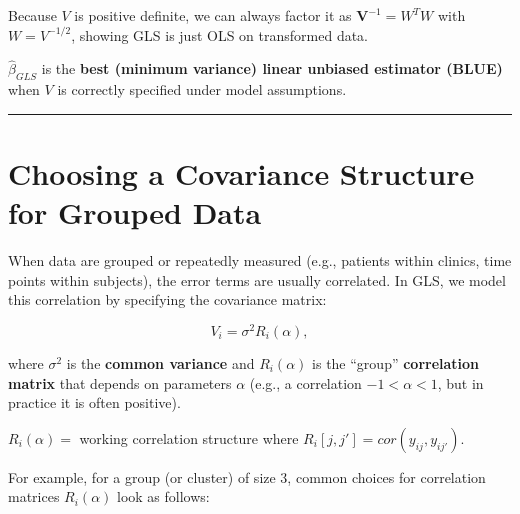 \documentclass[
  letterpaper,
  DIV=11,
  numbers=noendperiod]{scrreprt}
\begin{document}
Because \(V\) is positive definite, we can always factor it as
\(\mathbf{V}^{-1} = W^T W\) with \(W = V^{-1/2}\), showing GLS is just
OLS on transformed data.

\(\hat{\beta}_{GLS}\) is the \textbf{best (minimum variance) linear
unbiased estimator (BLUE)} when \(V\) is correctly specified under model
assumptions.

\begin{center}\rule{0.5\linewidth}{0.5pt}\end{center}

\hypertarget{choosing-a-covariance-structure-for-grouped-data}{%
\section*{Choosing a Covariance Structure for Grouped
Data}\label{choosing-a-covariance-structure-for-grouped-data}}


When data are grouped or repeatedly measured (e.g., patients within
clinics, time points within subjects), the error terms are usually
correlated. In GLS, we model this correlation by specifying the
covariance matrix:

\[
V_i = \sigma^2 R_i(\alpha),
\]

where \(\sigma^2\) is the \textbf{common variance} and \(R_i(\alpha)\)
is the ``group'' \textbf{correlation matrix} that depends on parameters
\(\alpha\) (e.g., a correlation \(-1 < \alpha < 1\), but in practice it
is often positive).

\(R_i(\alpha)=\) working correlation structure where
\(R_i[j, j'] = cor(y_{ij}, y_{ij'})\).

For example, for a group (or cluster) of size 3, common choices for
correlation matrices \(R_i(\alpha)\) look as follows:
\end{document}
